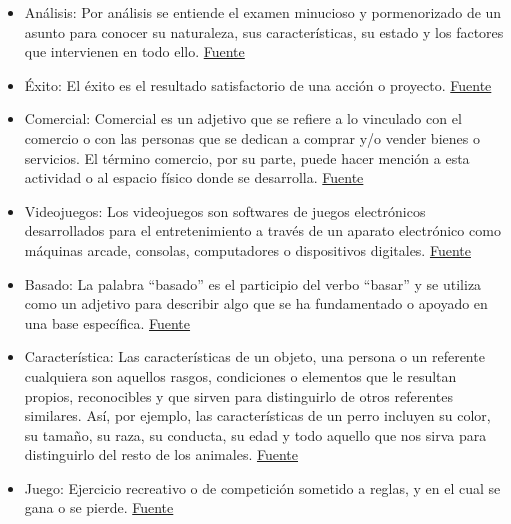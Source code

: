 \documentclass[
  letterpaper,
  DIV=11,
  numbers=noendperiod]{scrreprt}
\begin{document}
\begin{itemize}
\item
  Análisis: Por análisis se entiende el examen minucioso y pormenorizado
  de un asunto para conocer su naturaleza, sus características, su
  estado y los factores que intervienen en todo ello.
  \href{https://definicion.edu.lat/significados/analisis.html\#:~:text=Qu\%C3\%A9\%20es\%20An\%C3\%A1lisis\%3A\%20Por\%20an\%C3\%A1lisis\%20se\%20entiende\%20el,y\%20los\%20factores\%20que\%20intervienen\%20en\%20todo\%20ello.}{Fuente}
\item
  Éxito: El éxito es el resultado satisfactorio de una acción o
  proyecto.
  \href{https://definicion.edu.lat/concepto/exito.html}{Fuente}
\item
  Comercial: Comercial es un adjetivo que se refiere a lo vinculado con
  el comercio o con las personas que se dedican a comprar y/o vender
  bienes o servicios. El término comercio, por su parte, puede hacer
  mención a esta actividad o al espacio físico donde se desarrolla.
  \href{https://definicion.edu.lat/definicion/comercial.html}{Fuente}
\item
  Videojuegos: Los videojuegos son softwares de juegos electrónicos
  desarrollados para el entretenimiento a través de un aparato
  electrónico como máquinas arcade, consolas, computadores o
  dispositivos digitales.
  \href{https://definicion.edu.lat/significados/videojuego.html}{Fuente}
\item
  Basado: La palabra ``basado'' es el participio del verbo ``basar'' y
  se utiliza como un adjetivo para describir algo que se ha fundamentado
  o apoyado en una base específica.
  \href{https://www.definiciones-de.com/Definicion/de/basado.php\#:~:text=Definici\%C3\%B3n\%20de\%20basado\%20p.\%20La\%20palabra\%20\%22basado\%22\%20es,base\%20determinada\%2C\%20sin\%20perder\%20completamente\%20su\%20naturaleza\%20verbal.}{Fuente}
\item
  Característica: Las características de un objeto, una persona o un
  referente cualquiera son aquellos rasgos, condiciones o elementos que
  le resultan propios, reconocibles y que sirven para distinguirlo de
  otros referentes similares. Así, por ejemplo, las características de
  un perro incluyen su color, su tamaño, su raza, su conducta, su edad y
  todo aquello que nos sirva para distinguirlo del resto de los
  animales.
  \href{https://definicion.edu.lat/concepto/caracteristica.html}{Fuente}
\item
  Juego: Ejercicio recreativo o de competición sometido a reglas, y en
  el cual se gana o se pierde. \href{https://dle.rae.es/juego}{Fuente}
\end{itemize}
\end{document}
